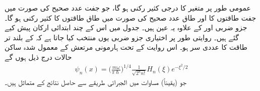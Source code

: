  عمومی طور پر  متغیر  کا  درجی کثیر رکنی ہو گا، جو جفت عدد صحیح  کی صورت میں جفت طاقتوں کا اور طاق عدد صحیح  کی صورت میں طاق طاقتوں کا کثیر رکنی ہو گا۔  جزو ضربی  اور 
کے علاوہ یہ عین   ہیں۔ جدول  میں اس کے چند ابتدائی ارکان پیش کیے  گئے ہیں۔ روایتی طور پر اختیاری جزو ضربی  یوں منتخب کیا جاتا ہے کہ  کے بلند تر طاقت کا عددی سر  ہو۔ اس روایت کے تحت ہارمونی مرتعش کے معمول شدہ ساکن حالات درج ذیل ہوں گے
\begin{align}
\psi_{n}(x)=\big (\frac{m\omega}{\pi\hslash}\big )^{1/4}\frac{1}{\sqrt{2^{n}n!}}H_{n}(\xi)e^{-\xi^{2}/2}
\end{align}
جو (یقیناً) مساوات  میں الجبرائی طریقے سے حاصل نتائج کے  متماثل ہیں۔

